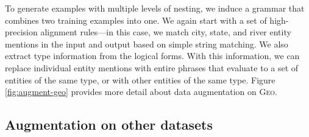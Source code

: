 \documentclass[11pt,letterpaper]{article}
\newcommand{\regex}{\textsc{Regex}\xspace}
\newcommand{\geo}{\textsc{Geo}\xspace}
\newcommand{\catroot}{\textsc{Root}\xspace}
\newcommand{\catquotstr}{\textsc{Str}\xspace}
\newcommand{\catint}{\textsc{Int}\xspace}
\newcommand\pl[1]{\textcolor{red}{[PL: #1]}}
\newcommand\rj[1]{\textcolor{blue}{[RJ: #1]}}
\begin{document}
To generate examples with multiple levels of nesting,
we induce a grammar that combines two training examples into one.
We again start with a set of high-precision alignment rules---in this case,
we match city, state, and river entity mentions in the input and output
based on simple string matching.
We also extract type information from the logical forms.
With this information, we can replace individual entity mentions
with entire phrases that evaluate to a set of entities of the same type,
or with other entities of the same type.
Figure \ref{fig:augment-geo}
provides more detail about data augmentation on \geo.


\subsection{Augmentation on other datasets}
%
%
%
%
%
%
%
%
%
%
%
\end{document}
